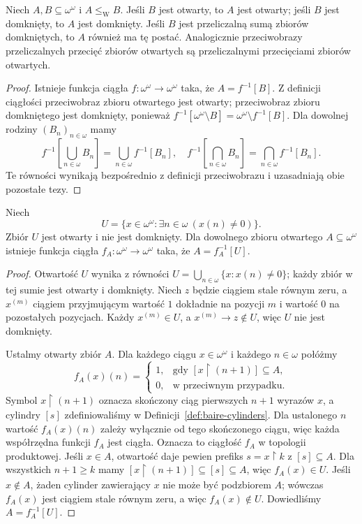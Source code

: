 \begin{lemat}
\label{lem:wadge-continuous-preimages}
Niech $A,B\subseteq\omega^\omega$ i
$A\leq_{\mathrm W}B$. Jeśli $B$ jest otwarty,
to $A$ jest otwarty; jeśli $B$ jest domknięty,
to $A$ jest domknięty. Jeśli $B$ jest przeliczalną
sumą zbiorów domkniętych, to $A$ również ma tę
postać. Analogicznie przeciwobrazy przeliczalnych
przecięć zbiorów otwartych są przeliczalnymi
przecięciami zbiorów otwartych.
\end{lemat}
\begin{proof}
Istnieje funkcja ciągła $f:\omega^\omega\to\omega^\omega$
taka, że $A=f^{-1}[B]$. Z definicji ciągłości
przeciwobraz zbioru otwartego jest otwarty;
przeciwobraz zbioru domkniętego jest domknięty,
ponieważ $f^{-1}[\omega^\omega\setminus B]
=\omega^\omega\setminus f^{-1}[B]$.
Dla dowolnej rodziny $(B_n)_{n\in\omega}$ mamy
\[
 f^{-1}\!\left[\bigcup_{n\in\omega}B_n\right]
 =\bigcup_{n\in\omega}f^{-1}[B_n],
 \quad
 f^{-1}\!\left[\bigcap_{n\in\omega}B_n\right]
 =\bigcap_{n\in\omega}f^{-1}[B_n].
\]
Te równości wynikają bezpośrednio z definicji
przeciwobrazu i uzasadniają obie pozostałe tezy.
\end{proof}

\begin{twierdzenie}
\label{thm:wadge-open-complete}
Niech
\[
 U=\{x\in\omega^\omega:\exists n\in\omega\ (x(n)\ne0)\}.
\]
Zbiór $U$ jest otwarty i nie jest domknięty.
Dla dowolnego zbioru otwartego $A\subseteq\omega^\omega$
istnieje funkcja ciągła $f_A:\omega^\omega\to\omega^\omega$
taka, że $A=f_A^{-1}[U]$.
\end{twierdzenie}
\begin{proof}
Otwartość $U$ wynika z równości
$U=\bigcup_{n\in\omega}\{x:x(n)\ne0\}$;
każdy zbiór w tej sumie jest otwarty i domknięty.
Niech $z$ będzie ciągiem stale równym zeru, a
$x^{(m)}$ ciągiem przyjmującym wartość $1$
dokładnie na pozycji $m$ i wartość $0$
na pozostałych pozycjach. Każdy $x^{(m)}\in U$,
a $x^{(m)}\to z\notin U$, więc $U$ nie jest
domknięty.

Ustalmy otwarty zbiór $A$. Dla każdego ciągu
$x\in\omega^\omega$ i każdego $n\in\omega$ połóżmy
\[
 f_A(x)(n)=
 \begin{cases}
  1,&\text{gdy }[x\upharpoonright(n+1)]\subseteq A,\\
  0,&\text{w przeciwnym przypadku}.
 \end{cases}
\]
Symbol $x\upharpoonright(n+1)$ oznacza skończony
ciąg pierwszych $n+1$ wyrazów $x$, a cylindry
$[s]$ zdefiniowaliśmy w Definicji~\ref{def:baire-cylinders}.
Dla ustalonego $n$ wartość $f_A(x)(n)$ zależy
wyłącznie od tego skończonego ciągu, więc każda
współrzędna funkcji $f_A$ jest ciągła. Oznacza to
ciągłość $f_A$ w topologii produktowej.
Jeśli $x\in A$, otwartość daje pewien prefiks
$s=x\upharpoonright k$ z $[s]\subseteq A$.
Dla wszystkich $n+1\ge k$ mamy
$[x\upharpoonright(n+1)]\subseteq[s]\subseteq A$,
więc $f_A(x)\in U$.
Jeśli $x\notin A$, żaden cylinder zawierający
$x$ nie może być podzbiorem $A$; wówczas
$f_A(x)$ jest ciągiem stale równym zeru,
a więc $f_A(x)\notin U$. Dowiedliśmy
$A=f_A^{-1}[U]$.
\end{proof}

